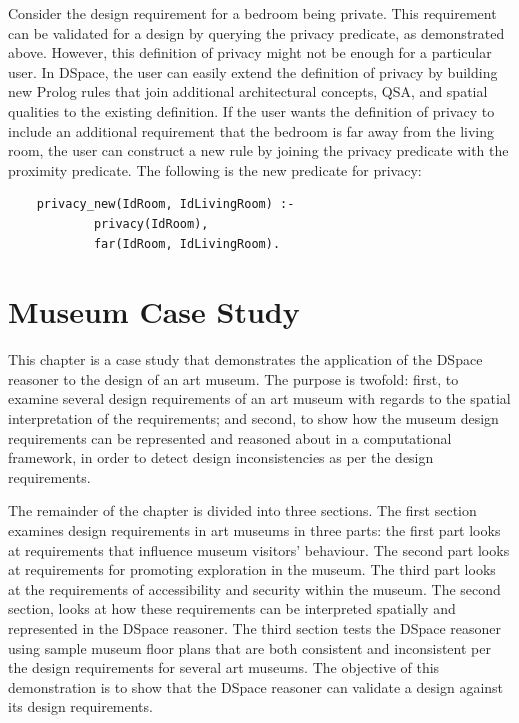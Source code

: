 \documentclass[12pt]{ucthesis}
\begin{document}
Consider the design requirement for a bedroom being private. This requirement can be validated for a design by querying the privacy predicate, as demonstrated above. However, this definition of privacy might not be enough for a particular user. In DSpace, the user can easily extend the definition of privacy by building new Prolog rules that join additional architectural concepts, QSA, and spatial qualities to the existing definition. If the user wants the definition of privacy to include an additional requirement that the bedroom is far away from the living room, the user can construct a new rule by joining the privacy predicate with the proximity predicate. The following is the new predicate for privacy:
\begin{verbatim}
    privacy_new(IdRoom, IdLivingRoom) :-
            privacy(IdRoom),
            far(IdRoom, IdLivingRoom).
\end{verbatim}



\chapter{Museum Case Study}
This chapter is a case study that demonstrates the application of the DSpace reasoner to the design of an art museum. The purpose is twofold: first, to examine several design requirements of an art museum with regards to the spatial interpretation of the requirements; and second, to show how the museum design requirements can be represented and reasoned about in a computational framework, in order to detect design inconsistencies as per the design requirements.

The remainder of the chapter is divided into three sections. The first section examines design requirements in art museums in three parts: the first part looks at requirements that influence museum visitors' behaviour. The second part looks at requirements for promoting exploration in the museum. The third part looks at the requirements of accessibility and security within the museum. The second section, looks at how these requirements can be interpreted spatially and represented in the DSpace reasoner. The third section tests the DSpace reasoner using sample museum floor plans that are both consistent and inconsistent per the design requirements for several art museums. The objective of this demonstration is to show that the DSpace reasoner can validate a design against its design requirements.
\end{document}
